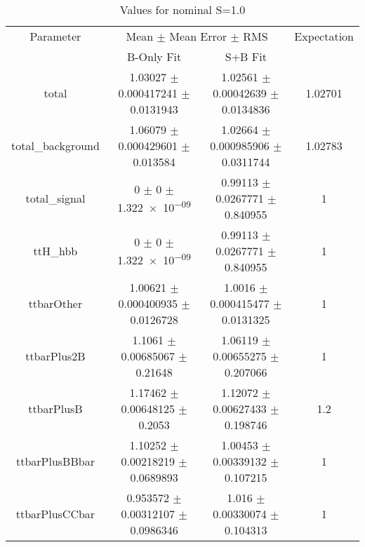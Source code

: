 \begin{table}
\centering
\caption{Values for nominal S=1.0}
\begin{tabular}{cccc}
\toprule
Parameter & \multicolumn{2}{c}{Mean $\pm$ Mean Error $\pm$ RMS} & Expectation\\
 & B-Only Fit & S+B Fit & \\
\midrule
total & \num{1.03027} $\pm$ \num{0.000417241} $\pm$ \num{0.0131943} & \num{1.02561} $\pm$ \num{0.00042639} $\pm$ \num{0.0134836} & \num{1.02701}\\
total\_background & \num{1.06079} $\pm$ \num{0.000429601} $\pm$ \num{0.013584} & \num{1.02664} $\pm$ \num{0.000985906} $\pm$ \num{0.0311744} & \num{1.02783}\\
total\_signal & \num{0} $\pm$ \num{0} $\pm$ \num{1.322e-09} & \num{0.99113} $\pm$ \num{0.0267771} $\pm$ \num{0.840955} & \num{1}\\
ttH\_hbb & \num{0} $\pm$ \num{0} $\pm$ \num{1.322e-09} & \num{0.99113} $\pm$ \num{0.0267771} $\pm$ \num{0.840955} & \num{1}\\
ttbarOther & \num{1.00621} $\pm$ \num{0.000400935} $\pm$ \num{0.0126728} & \num{1.0016} $\pm$ \num{0.000415477} $\pm$ \num{0.0131325} & \num{1}\\
ttbarPlus2B & \num{1.1061} $\pm$ \num{0.00685067} $\pm$ \num{0.21648} & \num{1.06119} $\pm$ \num{0.00655275} $\pm$ \num{0.207066} & \num{1}\\
ttbarPlusB & \num{1.17462} $\pm$ \num{0.00648125} $\pm$ \num{0.2053} & \num{1.12072} $\pm$ \num{0.00627433} $\pm$ \num{0.198746} & \num{1.2}\\
ttbarPlusBBbar & \num{1.10252} $\pm$ \num{0.00218219} $\pm$ \num{0.0689893} & \num{1.00453} $\pm$ \num{0.00339132} $\pm$ \num{0.107215} & \num{1}\\
ttbarPlusCCbar & \num{0.953572} $\pm$ \num{0.00312107} $\pm$ \num{0.0986346} & \num{1.016} $\pm$ \num{0.00330074} $\pm$ \num{0.104313} & \num{1}\\
\bottomrule
\end{tabular}
\end{table}